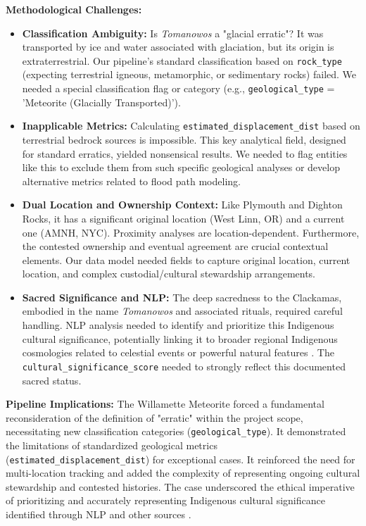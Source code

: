 \documentclass[
11pt, %
english, %
singlespacing, %
headsepline, %
]{MastersDoctoralThesis} %
\begin{document}
\textbf{Methodological Challenges:}
\begin{itemize}
    \item \textbf{Classification Ambiguity:} Is \emph{Tomanowos} a "glacial erratic"? It was transported by ice and water associated with glaciation, but its origin is extraterrestrial. Our pipeline's standard classification based on \texttt{rock\_type} (expecting terrestrial igneous, metamorphic, or sedimentary rocks) failed. We needed a special classification flag or category (e.g., \texttt{geological\_type} = 'Meteorite (Glacially Transported)').
    \item \textbf{Inapplicable Metrics:} Calculating \texttt{estimated\_displacement\_dist} based on terrestrial bedrock sources is impossible. This key analytical field, designed for standard erratics, yielded nonsensical results. We needed to flag entities like this to exclude them from such specific geological analyses or develop alternative metrics related to flood path modeling.
    \item \textbf{Dual Location and Ownership Context:} Like Plymouth and Dighton Rocks, it has a significant original location (West Linn, OR) and a current one (AMNH, NYC). Proximity analyses are location-dependent. Furthermore, the contested ownership and eventual agreement are crucial contextual elements. Our data model needed fields to capture original location, current location, and complex custodial/cultural stewardship arrangements.
    \item \textbf{Sacred Significance and NLP:} The deep sacredness to the Clackamas, embodied in the name \emph{Tomanowos} and associated rituals, required careful handling. NLP analysis needed to identify and prioritize this Indigenous cultural significance, potentially linking it to broader regional Indigenous cosmologies related to celestial events or powerful natural features \cite{ourtimebdTomanowosMeteorite}. The \texttt{cultural\_significance\_score} needed to strongly reflect this documented sacred status.
\end{itemize}

\textbf{Pipeline Implications:} The Willamette Meteorite forced a fundamental reconsideration of the definition of "erratic" within the project scope, necessitating new classification categories (\texttt{geological\_type}). It demonstrated the limitations of standardized geological metrics (\texttt{estimated\_displacement\_dist}) for exceptional cases. It reinforced the need for multi-location tracking and added the complexity of representing ongoing cultural stewardship and contested histories. The case underscored the ethical imperative of prioritizing and accurately representing Indigenous cultural significance identified through NLP and other sources \cite{statesmanjournalPiecesSacred}.
\end{document}

